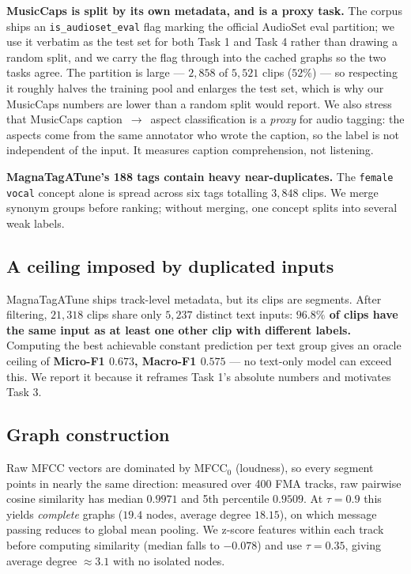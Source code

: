 \documentclass[conference]{IEEEtran}
\begin{document}
\textbf{MusicCaps is split by its own metadata, and is a proxy task.} The
corpus ships an \texttt{is\_audioset\_eval} flag marking the official AudioSet
eval partition; we use it verbatim as the test set for both Task 1 and Task 4
rather than drawing a random split, and we carry the flag through into the
cached graphs so the two tasks agree. The partition is large --- $2{,}858$ of
$5{,}521$ clips ($52\%$) --- so respecting it roughly halves the training pool
and enlarges the test set, which is why our MusicCaps numbers are lower than a
random split would report. We also stress that MusicCaps caption~$\to$~aspect
classification is a \emph{proxy} for audio tagging: the aspects come from the
same annotator who wrote the caption, so the label is not independent of the
input. It measures caption comprehension, not listening.

\textbf{MagnaTagATune's 188 tags contain heavy near-duplicates.} The
\texttt{female vocal} concept alone is spread across six tags totalling $3{,}848$
clips. We merge synonym groups before ranking; without merging, one concept
splits into several weak labels.

\subsection{A ceiling imposed by duplicated inputs}
MagnaTagATune ships track-level metadata, but its clips are segments. After
filtering, $21{,}318$ clips share only $5{,}237$ distinct text inputs:
\textbf{$96.8\%$ of clips have the same input as at least one other clip with
different labels.} Computing the best achievable constant prediction per text
group gives an oracle ceiling of
\textbf{Micro-F1 $0.673$, Macro-F1 $0.575$} --- no text-only model can exceed
this. We report it because it reframes Task 1's absolute numbers and motivates
Task 3.

\subsection{Graph construction}
Raw MFCC vectors are dominated by MFCC$_0$ (loudness), so every segment points
in nearly the same direction: measured over 400 FMA tracks, raw pairwise cosine
similarity has median $0.9971$ and 5th percentile $0.9509$. At $\tau = 0.9$ this
yields \emph{complete} graphs ($19.4$ nodes, average degree $18.15$), on which
message passing reduces to global mean pooling. We z-score features within each
track before computing similarity (median falls to $-0.078$) and use
$\tau = 0.35$, giving average degree $\approx 3.1$ with no isolated nodes.
\end{document}
